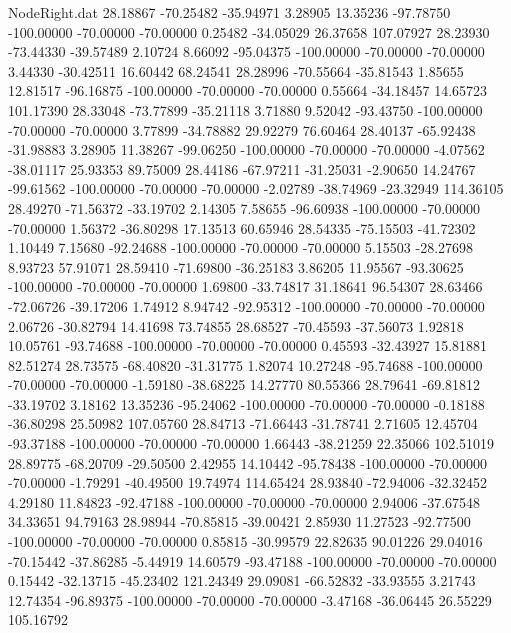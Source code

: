 \begin{filecontents}{NodeRight.dat}
  28.18867  -70.25482  -35.94971     3.28905   13.35236  -97.78750 -100.00000  -70.00000  -70.00000    0.25482  -34.05029   26.37658  107.07927
  28.23930  -73.44330  -39.57489     2.10724    8.66092  -95.04375 -100.00000  -70.00000  -70.00000    3.44330  -30.42511   16.60442   68.24541
  28.28996  -70.55664  -35.81543     1.85655   12.81517  -96.16875 -100.00000  -70.00000  -70.00000    0.55664  -34.18457   14.65723  101.17390
  28.33048  -73.77899  -35.21118     3.71880    9.52042  -93.43750 -100.00000  -70.00000  -70.00000    3.77899  -34.78882   29.92279   76.60464
  28.40137  -65.92438  -31.98883     3.28905   11.38267  -99.06250 -100.00000  -70.00000  -70.00000   -4.07562  -38.01117   25.93353   89.75009
  28.44186  -67.97211  -31.25031    -2.90650   14.24767  -99.61562 -100.00000  -70.00000  -70.00000   -2.02789  -38.74969  -23.32949  114.36105
  28.49270  -71.56372  -33.19702     2.14305    7.58655  -96.60938 -100.00000  -70.00000  -70.00000    1.56372  -36.80298   17.13513   60.65946
  28.54335  -75.15503  -41.72302     1.10449    7.15680  -92.24688 -100.00000  -70.00000  -70.00000    5.15503  -28.27698    8.93723   57.91071
  28.59410  -71.69800  -36.25183     3.86205   11.95567  -93.30625 -100.00000  -70.00000  -70.00000    1.69800  -33.74817   31.18641   96.54307
  28.63466  -72.06726  -39.17206     1.74912    8.94742  -92.95312 -100.00000  -70.00000  -70.00000    2.06726  -30.82794   14.41698   73.74855
  28.68527  -70.45593  -37.56073     1.92818   10.05761  -93.74688 -100.00000  -70.00000  -70.00000    0.45593  -32.43927   15.81881   82.51274
  28.73575  -68.40820  -31.31775     1.82074   10.27248  -95.74688 -100.00000  -70.00000  -70.00000   -1.59180  -38.68225   14.27770   80.55366
  28.79641  -69.81812  -33.19702     3.18162   13.35236  -95.24062 -100.00000  -70.00000  -70.00000   -0.18188  -36.80298   25.50982  107.05760
  28.84713  -71.66443  -31.78741     2.71605   12.45704  -93.37188 -100.00000  -70.00000  -70.00000    1.66443  -38.21259   22.35066  102.51019
  28.89775  -68.20709  -29.50500     2.42955   14.10442  -95.78438 -100.00000  -70.00000  -70.00000   -1.79291  -40.49500   19.74974  114.65424
  28.93840  -72.94006  -32.32452     4.29180   11.84823  -92.47188 -100.00000  -70.00000  -70.00000    2.94006  -37.67548   34.33651   94.79163
  28.98944  -70.85815  -39.00421     2.85930   11.27523  -92.77500 -100.00000  -70.00000  -70.00000    0.85815  -30.99579   22.82635   90.01226
  29.04016  -70.15442  -37.86285    -5.44919   14.60579  -93.47188 -100.00000  -70.00000  -70.00000    0.15442  -32.13715  -45.23402  121.24349
  29.09081  -66.52832  -33.93555     3.21743   12.74354  -96.89375 -100.00000  -70.00000  -70.00000   -3.47168  -36.06445   26.55229  105.16792

\end{filecontents}
